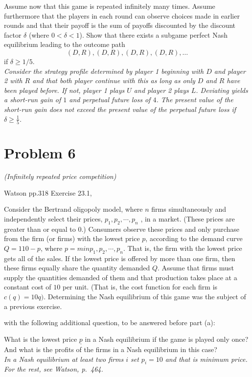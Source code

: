 \documentclass{article}
\begin{document}
Assume now that this game is repeated infinitely many times. Assume furthermore that the players in each round can observe choices made in earlier rounds and that their payoff is the sum of payoffs discounted by the discount factor   $\delta$ (where $0 < \delta < 1$). Show that there exists a subgame perfect Nash equilibrium leading to the outcome path
$$(D, R), (D, R), (D, R), (D, R), \dots $$
if $\delta \geq 1/5$. \\ \textit{Consider the strategy profile determined by player 1 beginning with $D$ and player 2 with $R$ and that both player continue with this as long as only $D$ and $R$ have been played before. If not, player 1 plays $U$ and player 2 plays $L$. Deviating yields a short-run gain of $1$ and perpetual future loss of $4$. The present value of the short-run gain does not exceed the present value of the perpetual future loss if $\delta \geq \tfrac15$.}




\section{Problem 6} \textit{(Infinitely repeated price competition)}

Watson pp.318 Exercise 23.1, 


Consider the Bertrand oligopoly model, where $n$ firms simultaneously and independently
select their prices, $p_1 , p_2 , \cdots , p_n$ , in a market. (These prices are
greater than or equal to $0$.) Consumers observe these prices and only purchase
from the firm (or firms) with the lowest price $p$, according to the demand
curve $Q = 110 − p$, where $p = min{p_1 , p_2 , \cdots , p_n}$. That is, the firm with
the lowest price gets all of the sales. If the lowest price is offered by more than
one firm, then these firms equally share the quantity demanded $Q$. Assume
that firms must supply the quantities demanded of them and that production
takes place at a constant cost of $10$ per unit. (That is, the cost function for each
firm is $c (q) = 10q)$. Determining the Nash equilibrium of this game was the
subject of a previous exercise.






with the following additional question, to be answered before part (a):

What is the lowest price $\underline{p}$ in a Nash equilibrium if the game is played only once?
And what is the profits of the firms in a Nash equilibrium in this case? \\ \textit{In a Nash equilibrium at least two firms $i$ set $p_i = 10$ and that is minimum price. For the rest, see Watson, p.~464.}
\end{document}
